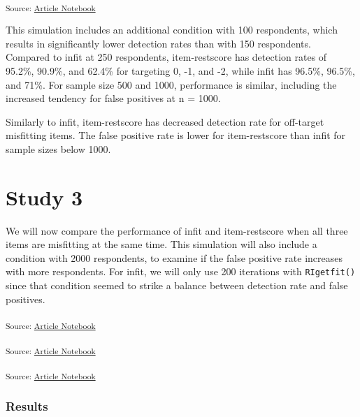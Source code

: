 \documentclass[
  letterpaper,
  DIV=11,
  numbers=noendperiod]{scrartcl}
\begin{document}
\textsubscript{Source:
\href{https://pgmj.github.io/rasch_itemfit/index.qmd.html}{Article
Notebook}}

This simulation includes an additional condition with 100 respondents,
which results in significantly lower detection rates than with 150
respondents. Compared to infit at 250 respondents, item-restscore has
detection rates of 95.2\%, 90.9\%, and 62.4\% for targeting 0, -1, and
-2, while infit has 96.5\%, 96.5\%, and 71\%. For sample size 500 and
1000, performance is similar, including the increased tendency for false
positives at n = 1000.

Similarly to infit, item-restscore has decreased detection rate for
off-target misfitting items. The false positive rate is lower for
item-restscore than infit for sample sizes below 1000.

\section{Study 3}\label{study-3}

We will now compare the performance of infit and item-restscore when all
three items are misfitting at the same time. This simulation will also
include a condition with 2000 respondents, to examine if the false
positive rate increases with more respondents. For infit, we will only
use 200 iterations with \texttt{RIgetfit()} since that condition seemed
to strike a balance between detection rate and false positives.

\textsubscript{Source:
\href{https://pgmj.github.io/rasch_itemfit/index.qmd.html}{Article
Notebook}}

\textsubscript{Source:
\href{https://pgmj.github.io/rasch_itemfit/index.qmd.html}{Article
Notebook}}

\textsubscript{Source:
\href{https://pgmj.github.io/rasch_itemfit/index.qmd.html}{Article
Notebook}}

\subsubsection{Results}\label{results-2}
\end{document}
